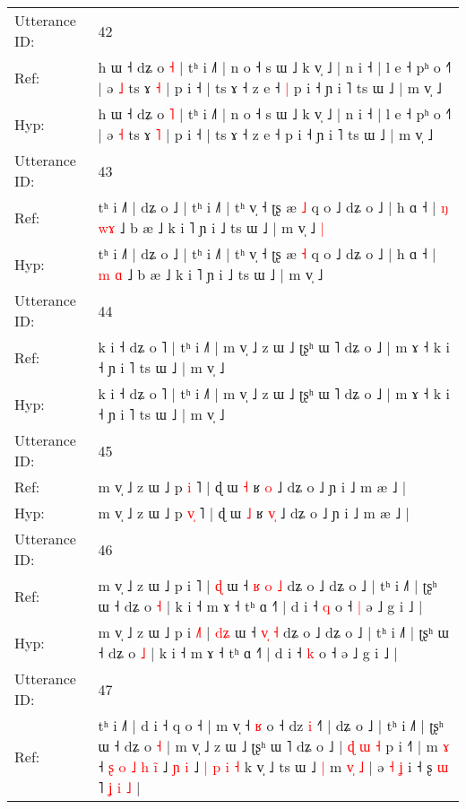 \documentclass[10pt]{article}
\DeclareRobustCommand{\hl}[1]{{\textcolor{red}{#1}}}
\begin{document}
\begin{longtable}{ll}
 \\
\midrule
Utterance ID: & 42 \\
Ref: & h ɯ ˧ dʑ o \hl{˧} | tʰ i ˩˥ | n o ˧ s ɯ ˩ k v̩ ˩ | n i ˧ | l e ˧ pʰ o ˧˥ | ə \hl{˩} ts ɤ \hl{˧} | p i ˧ | ts ɤ ˧ z e ˧\hl{ }\hl{|} p i ˧ ɲ i ˥ ts ɯ ˩ | m v̩ ˩
 \\
Hyp: & h ɯ ˧ dʑ o \hl{˥} | tʰ i ˩˥ | n o ˧ s ɯ ˩ k v̩ ˩ | n i ˧ | l e ˧ pʰ o ˧˥ | ə \hl{˧} ts ɤ \hl{˥} | p i ˧ | ts ɤ ˧ z e ˧\hl{}\hl{} p i ˧ ɲ i ˥ ts ɯ ˩ | m v̩ ˩
 \\
\midrule
Utterance ID: & 43 \\
Ref: & tʰ i ˩˥ | dʑ o ˩ | tʰ i ˩˥ | tʰ v̩ ˧ ʈʂ æ \hl{˩} q o ˩ dʑ o ˩ | h ɑ ˧ | \hl{ŋ} \hl{w}\hl{ɤ} ˩ b æ ˩ k i ˥ ɲ i ˩ ts ɯ ˩ | m v̩ ˩\hl{ }\hl{|}
 \\
Hyp: & tʰ i ˩˥ | dʑ o ˩ | tʰ i ˩˥ | tʰ v̩ ˧ ʈʂ æ \hl{˧} q o ˩ dʑ o ˩ | h ɑ ˧ | \hl{m} \hl{}\hl{ɑ} ˩ b æ ˩ k i ˥ ɲ i ˩ ts ɯ ˩ | m v̩ ˩\hl{}\hl{}
 \\
\midrule
Utterance ID: & 44 \\
Ref: & k i ˧ dʑ o ˥ | tʰ i ˩˥ | m v̩ ˩ z ɯ ˩ ʈʂʰ ɯ ˥ dʑ o ˩ | m ɤ ˧ k i ˧ ɲ i ˥ ts ɯ ˩ | m v̩ ˩
 \\
Hyp: & k i ˧ dʑ o ˥ | tʰ i ˩˥ | m v̩ ˩ z ɯ ˩ ʈʂʰ ɯ ˥ dʑ o ˩ | m ɤ ˧ k i ˧ ɲ i ˥ ts ɯ ˩ | m v̩ ˩
 \\
\midrule
Utterance ID: & 45 \\
Ref: & m v̩ ˩ z ɯ ˩ p \hl{}\hl{i} ˥ | ɖ ɯ \hl{˧} ʁ \hl{}\hl{o} ˩ dʑ o ˩ ɲ i ˩ m æ ˩ |
 \\
Hyp: & m v̩ ˩ z ɯ ˩ p \hl{v}\hl{̩} ˥ | ɖ ɯ \hl{˩} ʁ \hl{v}\hl{̩} ˩ dʑ o ˩ ɲ i ˩ m æ ˩ |
 \\
\midrule
Utterance ID: & 46 \\
Ref: & m v̩ ˩ z ɯ ˩ p i \hl{}˥ | \hl{}\hl{ɖ} ɯ ˧ \hl{ʁ}\hl{ }\hl{o} \hl{˩} dʑ o ˩ dʑ o ˩ | tʰ i ˩˥ | ʈʂʰ ɯ ˧ dʑ o \hl{˧} | k i ˧ m ɤ ˧ tʰ ɑ ˧˥ | d i ˧ \hl{q} o ˧\hl{ }\hl{|} ə ˩ g i ˩ |
 \\
Hyp: & m v̩ ˩ z ɯ ˩ p i \hl{˩}˥ | \hl{d}\hl{ʑ} ɯ ˧ \hl{}\hl{v}\hl{̩} \hl{˧} dʑ o ˩ dʑ o ˩ | tʰ i ˩˥ | ʈʂʰ ɯ ˧ dʑ o \hl{˩} | k i ˧ m ɤ ˧ tʰ ɑ ˧˥ | d i ˧ \hl{k} o ˧\hl{}\hl{} ə ˩ g i ˩ |
 \\
\midrule
Utterance ID: & 47 \\
Ref: & tʰ i ˩˥ | d i ˧ q o ˧ | m v̩ ˧ \hl{ʁ} o ˧ dz \hl{i} ˧˥ | dʑ o ˩ | tʰ i ˩˥ | ʈʂʰ ɯ ˧ dʑ o \hl{˧} | m v̩ ˩ z ɯ ˩ ʈʂʰ ɯ ˥ dʑ o ˩ | \hl{}\hl{ɖ} \hl{ɯ} \hl{˧} p i ˧˥ | m \hl{ɤ} ˧\hl{ }\hl{ʂ}\hl{ }\hl{o}\hl{ }\hl{˩} \hl{h} \hl{i}\hl{̃} ˩ \hl{ɲ}\hl{ }\hl{i} ˩\hl{ }\hl{|}\hl{ }\hl{p}\hl{ }\hl{i}\hl{ }\hl{˧} k v̩ ˩ ts ɯ ˩\hl{ }\hl{|} m\hl{ }\hl{v}\hl{̩}\hl{ }\hl{˩} | ə\hl{ }\hl{˧}\hl{ }\hl{ʝ} i ˧ ʂ \hl{ɯ} ˥\hl{ }\hl{ʝ}\hl{ }\hl{i}\hl{ }\hl{˩} |

\end{longtable}
\end{document}
